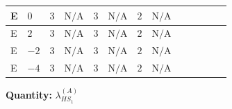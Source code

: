 \documentclass[8pt]{article}
\begin{document}
\begin{landscape}
\begin{longtable}{@{}llcccccc >{\raggedright\arraybackslash}p{0.21\linewidth} >{\raggedright\arraybackslash}p{0.21\linewidth} >{\raggedright\arraybackslash}p{0.21\linewidth}@{}}
\midrule
E & $0$ & $3$ & $\text{N/A}$ & $3$ & $\text{N/A}$ & $2$ & $\text{N/A}$ & \scriptsize\adjustbox{max width=\linewidth}{$\begin{gathered} +2 {\lambda_1} {\lambda_{HS_1}^{(A)}}\end{gathered}$} & \scriptsize\adjustbox{max width=\linewidth}{$\begin{gathered} +8 {\lambda_{HS_1}^{(1)}} {\lambda_{HS_1}^{(A)}}\end{gathered}$} & \scriptsize\adjustbox{max width=\linewidth}{$\begin{gathered} +2 {\lambda_{HS_1}^{(A)}} {\lambda_{S_1}^{(1)}}\end{gathered}$} \\
\midrule
E & $2$ & $3$ & $\text{N/A}$ & $3$ & $\text{N/A}$ & $2$ & $\text{N/A}$ & \scriptsize\adjustbox{max width=\linewidth}{$\begin{gathered} +2 {\lambda_1} {\lambda_{HS_1}^{(A)}}\end{gathered}$} & \scriptsize\adjustbox{max width=\linewidth}{$\begin{gathered} +8 {\lambda_{HS_1}^{(1)}} {\lambda_{HS_1}^{(A)}}\end{gathered}$} & \scriptsize\adjustbox{max width=\linewidth}{$\begin{gathered} +2 {\lambda_{HS_1}^{(A)}} {\lambda_{S_1}^{(1)}}\end{gathered}$} \\
\midrule
E & $-2$ & $3$ & $\text{N/A}$ & $3$ & $\text{N/A}$ & $2$ & $\text{N/A}$ & \scriptsize\adjustbox{max width=\linewidth}{$\begin{gathered} +2 {\lambda_1} {\lambda_{HS_1}^{(A)}}\end{gathered}$} & \scriptsize\adjustbox{max width=\linewidth}{$\begin{gathered} +8 {\lambda_{HS_1}^{(1)}} {\lambda_{HS_1}^{(A)}}\end{gathered}$} & \scriptsize\adjustbox{max width=\linewidth}{$\begin{gathered} +2 {\lambda_{HS_1}^{(A)}} {\lambda_{S_1}^{(1)}}\end{gathered}$} \\
\midrule
E & $-4$ & $3$ & $\text{N/A}$ & $3$ & $\text{N/A}$ & $2$ & $\text{N/A}$ & \scriptsize\adjustbox{max width=\linewidth}{$\begin{gathered} +2 {\lambda_1} {\lambda_{HS_1}^{(A)}}\end{gathered}$} & \scriptsize\adjustbox{max width=\linewidth}{$\begin{gathered} +8 {\lambda_{HS_1}^{(1)}} {\lambda_{HS_1}^{(A)}}\end{gathered}$} & \scriptsize\adjustbox{max width=\linewidth}{$\begin{gathered} +2 {\lambda_{HS_1}^{(A)}} {\lambda_{S_1}^{(1)}}\end{gathered}$} \\
\midrule
\bottomrule
\end{longtable}
\clearpage
\noindent\textbf{Quantity: }$\lambda_{HS_1}^{(A)}$\par\smallskip

\end{landscape}
\end{document}
